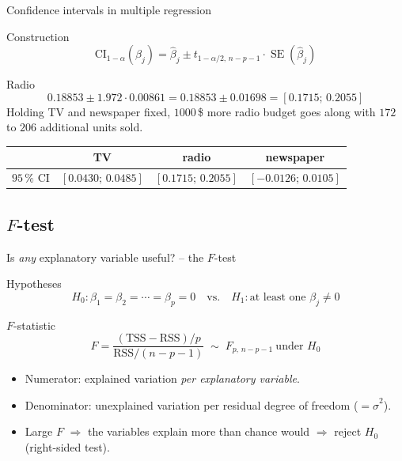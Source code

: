\documentclass[aspectratio=169,11pt]{beamer}
\begin{document}
\begin{frame}{Confidence intervals in multiple regression}
  \begin{block}{Construction}
    \[
      \text{CI}_{1-\alpha}(\beta_j)=\hat\beta_j\pm t_{1-\alpha/2,\,n-p-1}\cdot\operatorname{SE}(\hat\beta_j)
    \]
  \end{block}
  \begin{exampleblock}{Radio}
    \[
      0.18853\pm1.972\cdot0.00861=0.18853\pm0.01698=[0.1715;\,0.2055]
    \]
    Holding TV and newspaper fixed, $1000$\,\$ more radio budget goes along
    with $172$ to $206$ additional units sold.
  \end{exampleblock}
  \begin{center}
    \renewcommand{\arraystretch}{1.2}
    \begin{tabular}{lccc}
      \toprule
      & TV & radio & newspaper\\
      \midrule
      $95\,\%$ CI & $[0.0430;\,0.0485]$ & $[0.1715;\,0.2055]$ & $[-0.0126;\,0.0105]$\\
      \bottomrule
    \end{tabular}
  \end{center}
\end{frame}

\subsection{\texorpdfstring{$F$}{F}-test}

\begin{frame}{Is \emph{any} explanatory variable useful? -- the $F$-test}
  \begin{block}{Hypotheses}
    \[
      H_0:\beta_1=\beta_2=\cdots=\beta_p=0
      \quad\text{vs.}\quad
      H_1:\text{at least one }\beta_j\neq0
    \]
  \end{block}
  \begin{block}{$F$-statistic}
    \[
      F=\frac{(\text{TSS}-\text{RSS})/p}{\text{RSS}/(n-p-1)}
      \;\sim\;F_{p,\,n-p-1}\ \text{under }H_0
    \]
  \end{block}
  \begin{itemize}
    \item Numerator: explained variation \emph{per explanatory variable}.
    \item Denominator: unexplained variation per residual degree of freedom
          ($=\hat\sigma^2$).
    \item Large $F$ $\Rightarrow$ the variables explain more than chance
          would $\Rightarrow$ reject $H_0$ (right-sided test).
  \end{itemize}
\end{frame}
\end{document}
